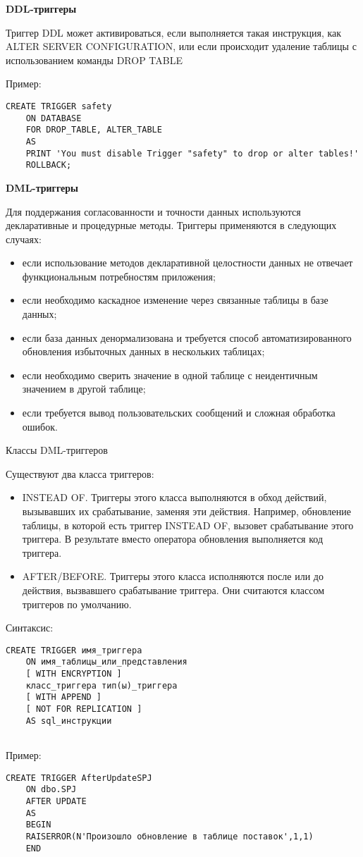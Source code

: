\textbf{DDL-триггеры}

Триггер DDL может активироваться, если выполняется такая инструкция, как ALTER
SERVER CONFIGURATION, или если происходит удаление таблицы с использованием
команды DROP TABLE

Пример:
\begin{lstlisting}[label=trigexample]
	CREATE TRIGGER safety
	ON DATABASE
	FOR DROP_TABLE, ALTER_TABLE
	AS
	PRINT 'You must disable Trigger "safety" to drop or alter tables!'
	ROLLBACK;
\end{lstlisting}

\textbf{DML-триггеры}

Для поддержания согласованности и точности данных используются декларативные и
процедурные методы.
Триггеры применяются в следующих случаях:
\begin{itemize}
	\item если использование методов декларативной целостности данных не отвечает
	функциональным потребностям приложения;
	\item если необходимо каскадное изменение через связанные таблицы в базе данных;
	\item если база данных денормализована и требуется способ автоматизированного обновления
	избыточных данных в нескольких таблицах;
	\item если необходимо сверить значение в одной таблице с неидентичным значением в другой
	таблице;
	\item если требуется вывод пользовательских сообщений и сложная обработка ошибок.
\end{itemize}

Классы DML-триггеров

Существуют два класса триггеров:
\begin{itemize}
	\item INSTEAD OF. Триггеры этого класса выполняются в обход действий, вызывавших их
	срабатывание, заменяя эти действия. Например, обновление таблицы, в которой есть
	триггер INSTEAD OF, вызовет срабатывание этого триггера. В результате вместо оператора
	обновления выполняется код триггера.
	\item AFTER/BEFORE. Триггеры этого класса исполняются после или до действия, вызвавшего
	срабатывание триггера. Они считаются классом триггеров по умолчанию.
\end{itemize}

Синтаксис:
\begin{lstlisting}[label=dmlsint]
	CREATE TRIGGER имя_триггера
	ON имя_таблицы_или_представления
	[ WITH ENCRYPTION ]
	класс_триггера тип(ы)_триггера
	[ WITH APPEND ]
	[ NOT FOR REPLICATION ]
	AS sql_инструкции
	
\end{lstlisting}
Пример:
\begin{lstlisting}[label=dmlexample]
	CREATE TRIGGER AfterUpdateSPJ
	ON dbo.SPJ
	AFTER UPDATE
	AS
	BEGIN
	RAISERROR(N'Произошло обновление в таблице поставок',1,1)
	END 
\end{lstlisting}

